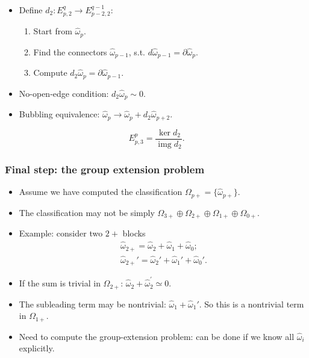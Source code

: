 \documentclass[xcolor=table, 11pt, aspectratio=169]{beamer}
\DeclareMathOperator{\img}{img}
\begin{document}
\begin{frame}
\begin{center}
\begin{animateinline}{5}
{
  }
  \end{animateinline}
  \end{center}
  \begin{itemize}
  \item Define $d_2:E^q_{p,2}\rightarrow E^{q-1}_{p-2,2}$:
  \begin{enumerate}
  \item Start from $\hat\omega_p$.
  \item Find the connectors $\hat\omega_{p-1}$, s.t. $d\hat\omega_{p-1}=\partial\hat\omega_p$.
  \item Compute $d_2\hat\omega_p=\partial\hat\omega_{p-1}$.
  \end{enumerate}
  \item No-open-edge condition: $d_2\hat\omega_p\sim0$.
  \item Bubbling equivalence: $\hat\omega_p\rightarrow\hat\omega_p+d_2\hat\omega_{p+2}$.
  \end{itemize}
  \[E^p_{p,3}=\frac{\ker d_2}{\img d_2}.\]
  \end{frame}
  
  \begin{frame}
  \frametitle{Final step: the group extension problem}
  \begin{itemize}
  \item Assume we have computed the classification $\Omega_{p+}=\{\hat\omega_{p+}\}$.
  \item The classification may not be simply $\Omega_{3+}\oplus\Omega_{2+}\oplus \Omega_{1+} \oplus \Omega_{0+} $.
  \item Example: consider two $2+$ blocks
  \begin{align*}
  \hat\omega_{2+}=\hat\omega_2+\hat\omega_1+\hat\omega_0;\\
  \hat\omega_{2+}'=\hat\omega_2'+\hat\omega_1'+\hat\omega_0'.
  \end{align*}
  \item If the sum is trivial in $\Omega_{2+}$: $\hat\omega_2+\hat\omega_2^\prime\simeq0$.
  \item The subleading term may be nontrivial: $\hat\omega_1+\hat\omega_1'$. So this is a nontrivial term in $\Omega_{1+}$.
  \item Need to compute the group-extension problem: can be done if we know all $\hat\omega_i$ explicitly.
  \end{itemize}
  \end{frame}
  
\end{document}
